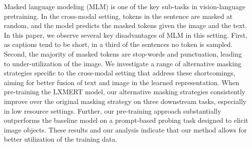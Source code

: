 Masked language modeling (MLM) is one of the key  sub-tasks in vision-language pretraining. In the cross-modal setting, tokens in the sentence are masked at random, and the model predicts the masked tokens given the image and the text. In this paper, we observe several key disadvantages of MLM in this setting. First, as captions tend to be short, in a third of the sentences no token is sampled. Second, the majority of masked tokens are stop-words and punctuation, leading to under-utilization of the image. We investigate a range of alternative masking strategies specific to the cross-modal setting that address these shortcomings, aiming for better fusion of text and image in the learned representation. When pre-training the LXMERT model, our alternative masking strategies consistently improve over the original masking strategy on three downstream tasks, especially in low resource settings. Further, our pre-training approach substantially outperforms the baseline model on a prompt-based probing task designed to elicit image objects. These results and our analysis indicate that our method allows for better utilization of the training data.
